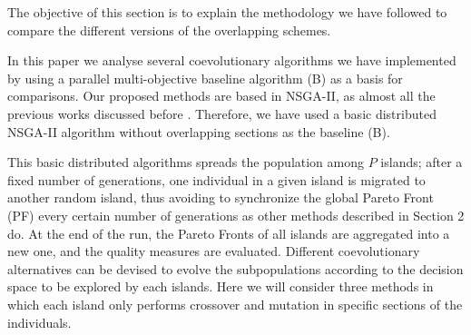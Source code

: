\documentclass[preprint]{elsarticle}
\begin{document}
The objective of this section is to explain the methodology we have followed to
compare the different versions of the overlapping schemes.

In this paper we analyse several coevolutionary algorithms we have
implemented by using a parallel multi-objective baseline algorithm (B)
as a basis for comparisons. Our proposed methods %
are based in NSGA-II, as almost all the previous works discussed
before
\cite{Dorronsoro13superlinear,Durillo08masterslave,Hiroyasu07discussion,Deb03distributed,Xiao03specialized,Wang09parallel,Martens13asynchronous}. %
Therefore, we have used a basic distributed NSGA-II algorithm without
overlapping sections as the baseline (B).

This basic distributed algorithms spreads the population among $P$
islands; after a fixed number of generations,
one individual in a given island is migrated to another random island,
thus avoiding to synchronize the global Pareto Front (PF) every
certain number of generations as other methods described in Section 2
do. At the end of the run, the Pareto Fronts of all islands are
aggregated into a new one, and the quality measures are evaluated. 
Different coevolutionary alternatives can be devised to evolve the
subpopulations according to the decision space to be explored by each
islands. Here we will consider three methods in which each island only
performs crossover and mutation in specific sections of the
individuals. 



%
\end{document}
